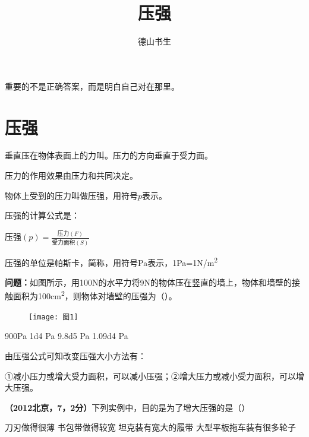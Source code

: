 \documentclass[12pt]{exam}%
\begin{document}
\begin{coverpages}
\title{压强}
\author{德山书生}
\maketitle
\tableofcontents
\end{coverpages}
\begin{knowledge}
\begin{flushright}
\begin{notecard}{12em}
\ttfamily
重要的不是正确答案，而是明白自己对在那里。
\end{notecard}
\end{flushright}
\section{压强}
垂直压在物体表面上的力叫\answerline*[压力]。压力的方向垂直于受力面。

压力的作用效果由压力和\answerline*[受力面积]共同决定。

物体\answerline*[单位面积]上受到的压力叫做压强，用符号$p$表示。

压强的计算公式是：
\begin{solutionorbox}[6ex]
$\textrm{压强}(p)=\frac{\textrm{压力}(F)}{\textrm{受力面积}(S)}$
\end{solutionorbox}

压强的单位是帕斯卡，简称\answerline*[帕]，用符号Pa表示，1Pa=1\si{N/m^2}


\textbf{问题：}如图所示，用100N的水平力将9N的物体压在竖直的墙上，物体和墙壁的接触面积为\si{100cm^2}，则物体对墙壁的压强为（\answerline*[B]）。
\begin{multicols}{2}
\begin{figure}[H]
\texttt{[image: 图1]}
\end{figure}
\columnbreak
\begin{choices}
\choice  900Pa 
\choice  \num{1d4} Pa
\choice \num{9.8d5} Pa 
\choice \num{1.09d4} Pa 
\end{choices}
\end{multicols}


由压强公式可知改变压强大小方法有：
\begin{solutionorbox}[8ex]
①减小压力或增大受力面积，可以减小压强；②增大压力或减小受力面积，可以增大压强。
\end{solutionorbox}


\textbf{（2012北京，7，2分）}下列实例中，目的是为了增大压强的是（\answerline*[A]）
\begin{choices}
\begin{multicols}{2}
\choice 刀刃做得很薄
\choice 书包带做得较宽
\columnbreak
\choice 坦克装有宽大的履带
\choice 大型平板拖车装有很多轮子
\end{multicols}
\end{choices}


\end{knowledge}
\end{document}

